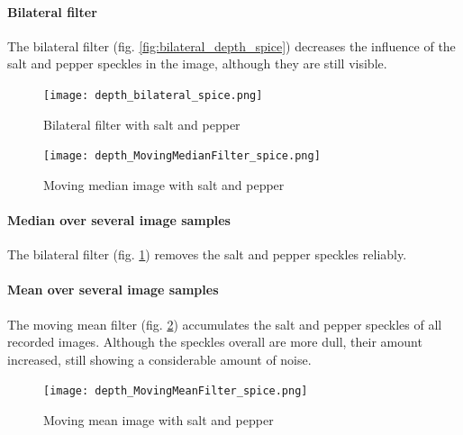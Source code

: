 \documentclass[DIV12,a4paper]{scrartcl}
\begin{document}
\paragraph{Bilateral filter}
The bilateral filter (fig. \ref{fig:bilateral_depth_spice}) decreases the influence of the salt and pepper speckles in the image, although they are still visible.
\begin{figure}[h!tbp]
  \centering
  \begin{minipage}{.5\textwidth}
    \centering
    \texttt{[image: depth\_bilateral\_spice.png]}
    \caption{Bilateral filter with salt and pepper}
    \label{fig:bilateral_depth_spice}
  \end{minipage}%
  \begin{minipage}{.5\textwidth}
    \centering
    \texttt{[image: depth\_MovingMedianFilter\_spice.png]}
    \caption{Moving median image with salt and pepper}
    \label{fig:moving_median_depth_spice}
  \end{minipage}
\end{figure}
\paragraph{Median over several image samples}
The bilateral filter (fig. \ref{fig:moving_median_depth_spice}) removes the salt and pepper speckles reliably.
\paragraph{Mean over several image samples}
The moving mean filter (fig. \ref{fig:moving_mean_depth_spice}) accumulates the salt and pepper speckles of all recorded images. Although the speckles overall are more dull, their amount increased, still showing a considerable amount of noise.
\begin{figure}[h!tbp]
  \centering
  \texttt{[image: depth\_MovingMeanFilter\_spice.png]}
  \caption{Moving mean image with salt and pepper}
  \label{fig:moving_mean_depth_spice}
\end{figure}
\end{document}
